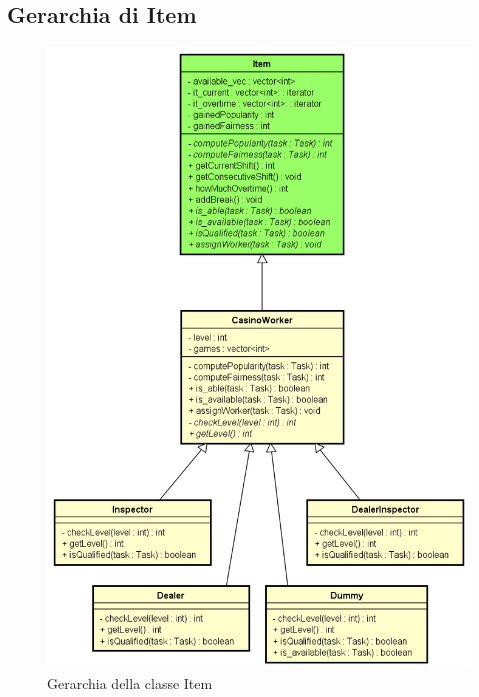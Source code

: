 \subsection{Gerarchia di Item}
\begin{figure}[!h]
    \begin{widepage}
        \centering
        \includegraphics[width=12cm,keepaspectratio]{../immagini/progettazione/item.png}
        \caption{Gerarchia della classe Item}
    \end{widepage}
\end{figure}
\FloatBarrier
\noindent
